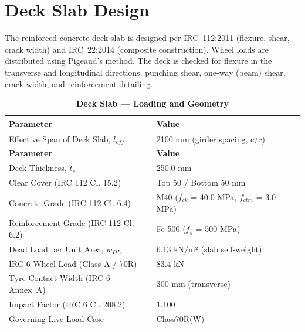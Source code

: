 \documentclass[12pt,a4paper]{report}
\numberwithin{table}{chapter}
\numberwithin{figure}{chapter}
\begin{document}
\section{Deck Slab Design}
\label{sec:deck-design}

The reinforced concrete deck slab is designed per IRC~112:2011 (flexure, shear, crack width) and IRC~22:2014 (composite construction). Wheel loads are distributed using Pigeaud's method. The deck is checked for flexure in the transverse and longitudinal directions, punching shear, one-way (beam) shear, crack width, and reinforcement detailing.

\vspace{1em}
\begin{longtable}{|L{5.5cm}|p{10.0cm}|}
\caption{\textbf{Deck Slab --- Loading and Geometry}}
\hline
\textbf{Parameter} & \textbf{Value} \\[6pt]
\hline
\textnormal{Effective Span of Deck Slab, $l_{eff}$} & 2100 mm (girder spacing, c/c) \\[6pt]
\hline

\endfirsthead
\hline
\textbf{Parameter} & \textbf{Value} \\[6pt]
\hline
\endhead
\textnormal{Deck Thickness, $t_s$} & 250.0 mm \\[6pt]
\hline
\textnormal{Clear Cover (IRC 112 Cl. 15.2)} & Top 50 / Bottom 50 mm \\[6pt]
\hline
\textnormal{Concrete Grade (IRC 112 Cl. 6.4)} & M40 ($f_{ck}$ = 40.0 MPa, $f_{ctm}$ = 3.0 MPa) \\[6pt]
\hline
\textnormal{Reinforcement Grade (IRC 112 Cl. 6.2)} & Fe 500 ($f_y$ = 500 MPa) \\[6pt]
\hline
\textnormal{Dead Load per Unit Area, $w_{DL}$} & 6.13 kN/m² (slab self-weight) \\[6pt]
\hline
\textnormal{IRC 6 Wheel Load (Class A / 70R)} & 83.4 kN \\[6pt]
\hline
\textnormal{Tyre Contact Width (IRC 6 Annex~A)} & 300 mm (transverse) \\[6pt]
\hline
\textnormal{Impact Factor (IRC 6 Cl. 208.2)} & 1.100 \\[6pt]
\hline
\textnormal{Governing Live Load Case} & Class70R(W) \\[6pt]
\hline
\end{longtable}
\end{document}
